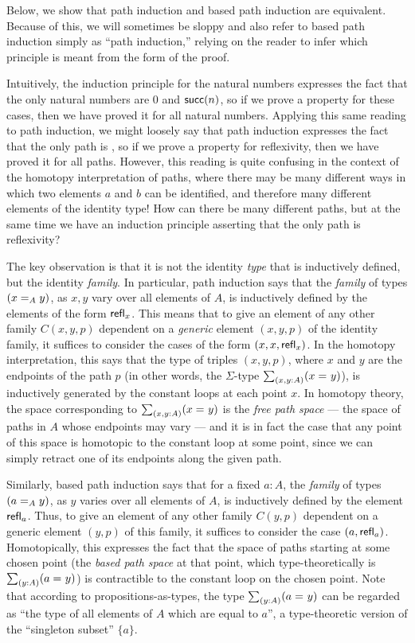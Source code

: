Below, we show that path induction and based path induction are equivalent.  Because of this, we will sometimes be sloppy and also refer to based path induction simply as ``path induction,'' relying on the reader to infer which principle is meant from the form of the proof.  

\begin{rmk}
Intuitively, the induction principle for the natural numbers expresses the fact that the only natural numbers are $0$ and $\suc(n)$, so if we prove a property for these cases, then we have proved it for all natural numbers.  Applying this same reading to path induction, we might loosely say that path induction expresses the fact that the only path is , so if we prove a property for reflexivity, then we have proved it for all paths.  However, this reading is quite confusing in the context of the homotopy interpretation of paths, where there may be many different ways in which two elements $a$ and $b$ can be identified, and therefore many different elements of the identity type!  How can there be many different paths, but at the same time we have an induction principle asserting that the only path is reflexivity?

The key observation is that it is not the identity \emph{type} that is inductively defined, but the identity \emph{family}.
In particular, path induction says that the \emph{family} of types $(\id[A]{x}{y})$, as $x,y$ vary over all elements of $A$, is inductively defined by the elements of the form $\refl{x}$.
This means that to give an element of any other family $C(x,y,p)$ dependent on a \emph{generic} element $(x,y,p)$ of the identity family, it suffices to consider the cases of the form $(x,x,\refl{x})$.
In the homotopy interpretation, this says that the type of triples $(x,y,p)$, where $x$ and $y$ are the endpoints of the path $p$ (in other words, the $\Sigma$-type $\sm{x,y:A}(\id{x}{y})$), is inductively generated by the constant loops at each point $x$.
In homotopy theory, the space corresponding to $\sm{x,y:A}(\id{x}{y})$ is the \emph{free path space} --- the space of paths in $A$ whose endpoints may vary --- and it is in fact the case that any point of this space is homotopic to the constant loop at some point, since we can simply retract one of its endpoints along the given path.

Similarly, based path induction says that for a fixed $a:A$, the \emph{family} of types $(\id[A]{a}{y})$, as $y$ varies over all elements of $A$, is inductively defined by the element $\refl{a}$.
Thus, to give an element of any other family $C(y,p)$ dependent on a generic element $(y,p)$ of this family, it suffices to consider the case $(a,\refl{a})$.
Homotopically, this expresses the fact that the space of paths starting at some chosen point (the \emph{based path space} at that point, which type-theoretically is $\sm{y:A} (\id{a}{y})$) is contractible to the constant loop on the chosen point.
Note that according to propositions-as-types, the type $\sm{y:A}(\id{a}{y})$ can be regarded as ``the type of all elements of $A$ which are equal to $a$'', a type-theoretic version of the ``singleton subset'' $\{a\}$.


\end{rmk}
